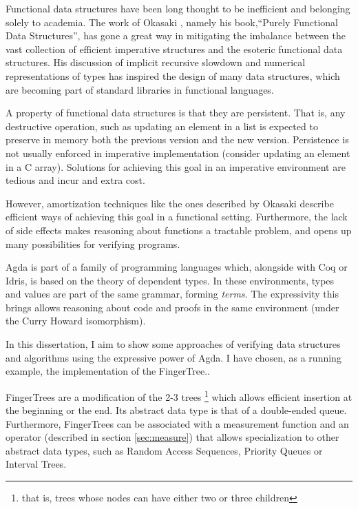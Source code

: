 \documentclass[12pt,twoside,notitlepage]{report}
\begin{document}
Functional data structures have been long thought to be inefficient and belonging solely to academia. The work of Okasaki \cite{okasaki}, namely his book,“Purely Functional Data Structures”, has gone a great way in mitigating the imbalance between the vast collection of efficient imperative structures and the esoteric functional data structures. His discussion of implicit recursive slowdown and numerical representations of types has inspired the design of many data structures, which are becoming part of standard libraries in functional languages.

A property of functional data structures is that they are persistent. That is, any destructive operation, such as updating an element in a list is expected to preserve in memory both the previous version and the new version. Persistence is not usually enforced in imperative implementation (consider updating an element in a C array). Solutions for achieving this goal in an imperative environment are tedious and incur and extra cost. 

However, amortization techniques like the ones described by Okasaki describe efficient ways of achieving this goal in a functional setting. Furthermore, the lack of side effects makes reasoning about functions a tractable problem, and opens up many possibilities for verifying programs.

Agda is part of a family of programming languages which, alongside with Coq or Idris, is based on the theory of dependent types. In these environments, types and values are part of the same grammar, forming \textit{terms}. The expressivity this brings allows reasoning about code and proofs in the same environment (under the Curry Howard isomorphism).  

In this dissertation, I aim to show some approaches of verifying data structures and algorithms using the expressive power of Agda. I have chosen, as a running example, the implementation of the FingerTree.\cite{fingertrees}.

FingerTrees are a modification of the 2-3 trees \footnote{that is, trees whose nodes can have either two or three children} which allows efficient insertion at the beginning or the end. Its abstract data type is that of a double-ended queue. Furthermore, FingerTrees can be associated with a measurement function and an operator (described in section \ref{sec:measure}) that allows specialization to other abstract data types, such as Random Access Sequences, Priority Queues or Interval Trees.
\end{document}
